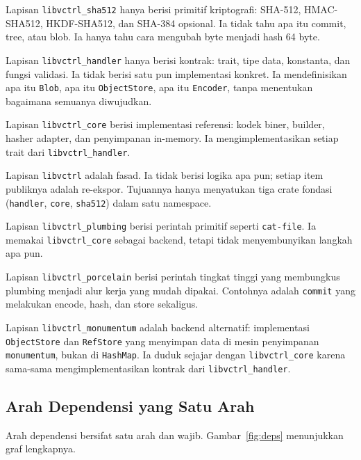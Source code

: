 \documentclass[11pt,a4paper]{article}
\begin{document}
Lapisan \texttt{libvctrl\_sha512} hanya berisi primitif kriptografi: SHA-512, HMAC-SHA512, HKDF-SHA512, dan SHA-384 opsional. Ia tidak tahu apa itu commit, tree, atau blob. Ia hanya tahu cara mengubah byte menjadi hash 64 byte.

Lapisan \texttt{libvctrl\_handler} hanya berisi kontrak: trait, tipe data, konstanta, dan fungsi validasi. Ia tidak berisi satu pun implementasi konkret. Ia mendefinisikan apa itu \texttt{Blob}, apa itu \texttt{ObjectStore}, apa itu \texttt{Encoder}, tanpa menentukan bagaimana semuanya diwujudkan.

Lapisan \texttt{libvctrl\_core} berisi implementasi referensi: kodek biner, builder, hasher adapter, dan penyimpanan in-memory. Ia mengimplementasikan setiap trait dari \texttt{libvctrl\_handler}.

Lapisan \texttt{libvctrl} adalah fasad. Ia tidak berisi logika apa pun; setiap item publiknya adalah re-ekspor. Tujuannya hanya menyatukan tiga crate fondasi (\texttt{handler}, \texttt{core}, \texttt{sha512}) dalam satu namespace.

Lapisan \texttt{libvctrl\_plumbing} berisi perintah primitif seperti \texttt{cat-file}. Ia memakai \texttt{libvctrl\_core} sebagai backend, tetapi tidak menyembunyikan langkah apa pun.

Lapisan \texttt{libvctrl\_porcelain} berisi perintah tingkat tinggi yang membungkus plumbing menjadi alur kerja yang mudah dipakai. Contohnya adalah \texttt{commit} yang melakukan encode, hash, dan store sekaligus.

Lapisan \texttt{libvctrl\_monumentum} adalah backend alternatif: implementasi \texttt{ObjectStore} dan \texttt{RefStore} yang menyimpan data di mesin penyimpanan \texttt{monumentum}, bukan di \texttt{HashMap}. Ia duduk sejajar dengan \texttt{libvctrl\_core} karena sama-sama mengimplementasikan kontrak dari \texttt{libvctrl\_handler}.

\subsection{Arah Dependensi yang Satu Arah}

Arah dependensi bersifat satu arah dan wajib. Gambar~\ref{fig:deps} menunjukkan graf lengkapnya.
\end{document}

